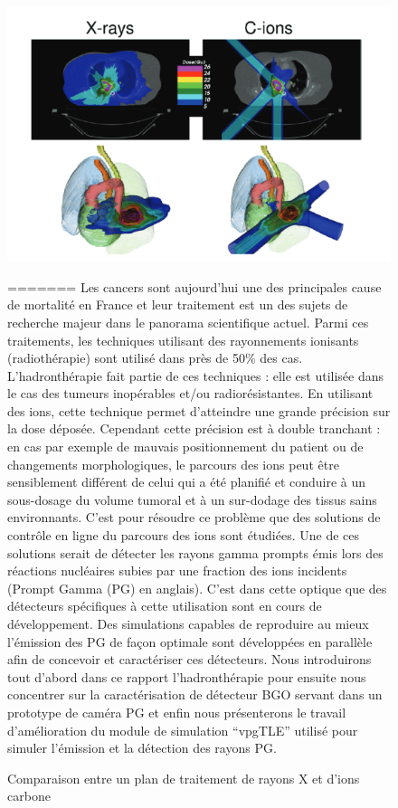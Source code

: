 \documentclass[11pt,a4paper,oldfontcommands]{memoir}
\begin{document}
\begin{figure}
    \centering
    \includegraphics[scale = 0.7]{intro/xrvshDuranteetal2016.png}
    \caption{Comparaison entre un plan de traitement de rayons X et d'ions carbone \cite{Durante_2016}}
=======
Les cancers sont aujourd'hui une des principales cause de mortalité en France et leur traitement est un des sujets de recherche majeur dans le panorama scientifique actuel. Parmi ces traitements, les techniques utilisant des rayonnements ionisants (radiothérapie) sont utilisé dans près de 50\% des cas. L'hadronthérapie fait partie de ces techniques : elle est utilisée dans le cas des tumeurs inopérables et/ou radiorésistantes. En utilisant des ions, cette technique permet d'atteindre une grande précision sur la dose déposée. Cependant cette précision est à double tranchant : en cas par exemple de mauvais positionnement du patient ou de changements morphologiques, le parcours des ions peut être sensiblement différent de celui qui a été planifié et conduire à un sous-dosage du volume tumoral et à un sur-dodage des tissus sains environnants. C'est pour résoudre ce problème que des solutions de contrôle en ligne du parcours des ions sont étudiées. Une de ces solutions serait de détecter les rayons gamma prompts émis lors des réactions nucléaires subies par une fraction des ions incidents (Prompt Gamma (PG) en anglais). C'est dans cette optique que des détecteurs spécifiques à cette utilisation sont en cours de développement. Des simulations capables de reproduire au mieux l'émission des PG de façon optimale sont développées en parallèle afin de concevoir et caractériser ces détecteurs. Nous introduirons tout d'abord dans ce rapport l'hadronthérapie pour ensuite nous concentrer sur la caractérisation de détecteur BGO servant dans un prototype de caméra PG et enfin nous présenterons le travail d'amélioration du module de simulation \enquote{vpgTLE} utilisé pour simuler l'émission et la détection des rayons PG.


\end{figure}
\end{document}
